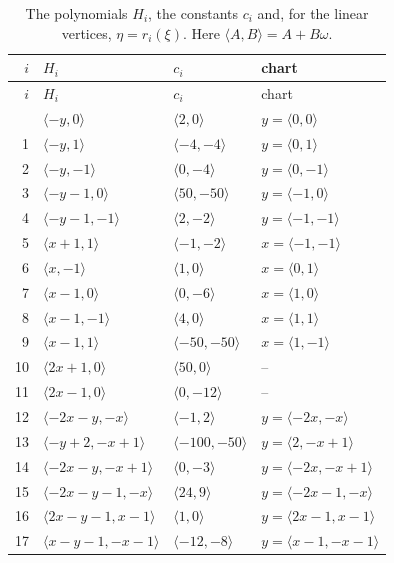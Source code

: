 \documentclass[11pt]{article}
\begin{document}
\clearpage
\begingroup\small
\setlength{\LTcapwidth}{\textwidth}
\begin{longtable}{@{}rlll@{}}
\caption{The polynomials $H_i$, the constants $c_i$ and, for the linear vertices, $\eta=r_i(\xi)$. Here $\langle A,B\rangle=A+B\omega$.}\label{tab:vert1}\\
\hline $i$ & $H_i$ & $c_i$ & chart\\\hline\endfirsthead\hline $i$ & $H_i$ & $c_i$ & chart\\\hline\endhead\hline\endfoot
0 & $\langle -y,0\rangle$ & $\langle 2,0\rangle$ & $y=\langle 0,0\rangle$\\
1 & $\langle -y,1\rangle$ & $\langle -4,-4\rangle$ & $y=\langle 0,1\rangle$\\
2 & $\langle -y,-1\rangle$ & $\langle 0,-4\rangle$ & $y=\langle 0,-1\rangle$\\
3 & $\langle -y-1,0\rangle$ & $\langle 50,-50\rangle$ & $y=\langle -1,0\rangle$\\
4 & $\langle -y-1,-1\rangle$ & $\langle 2,-2\rangle$ & $y=\langle -1,-1\rangle$\\
5 & $\langle x+1,1\rangle$ & $\langle -1,-2\rangle$ & $x=\langle -1,-1\rangle$\\
6 & $\langle x,-1\rangle$ & $\langle 1,0\rangle$ & $x=\langle 0,1\rangle$\\
7 & $\langle x-1,0\rangle$ & $\langle 0,-6\rangle$ & $x=\langle 1,0\rangle$\\
8 & $\langle x-1,-1\rangle$ & $\langle 4,0\rangle$ & $x=\langle 1,1\rangle$\\
9 & $\langle x-1,1\rangle$ & $\langle -50,-50\rangle$ & $x=\langle 1,-1\rangle$\\
10 & $\langle 2x+1,0\rangle$ & $\langle 50,0\rangle$ & --\\
11 & $\langle 2x-1,0\rangle$ & $\langle 0,-12\rangle$ & --\\
12 & $\langle -2x-y,-x\rangle$ & $\langle -1,2\rangle$ & $y=\langle -2x,-x\rangle$\\
13 & $\langle -y+2,-x+1\rangle$ & $\langle -100,-50\rangle$ & $y=\langle 2,-x+1\rangle$\\
14 & $\langle -2x-y,-x+1\rangle$ & $\langle 0,-3\rangle$ & $y=\langle -2x,-x+1\rangle$\\
15 & $\langle -2x-y-1,-x\rangle$ & $\langle 24,9\rangle$ & $y=\langle -2x-1,-x\rangle$\\
16 & $\langle 2x-y-1,x-1\rangle$ & $\langle 1,0\rangle$ & $y=\langle 2x-1,x-1\rangle$\\
17 & $\langle x-y-1,-x-1\rangle$ & $\langle -12,-8\rangle$ & $y=\langle x-1,-x-1\rangle$\\

\end{longtable}
\end{document}
